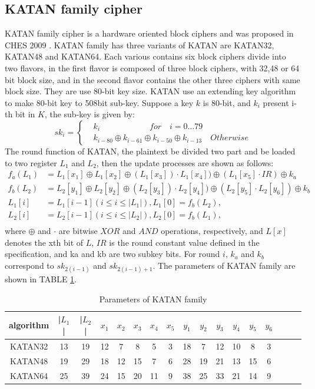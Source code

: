 \subsection{KATAN family cipher}
KATAN family cipher is a hardware oriented block ciphers and was proposed in CHES 2009 \cite{10.1007/978-3-642-04138-9_20}. KATAN family has three variants of KATAN are KATAN32, KATAN48 and KATAN64. Each various contains six block ciphers divide into two flavors, in the first flavor is composed of three block ciphers, with 32,48 or 64 bit block size, and in the second flavor contains the other three ciphers with same block size. They are use 80-bit key size. KATAN use an extending key algorithm to make 80-bit key to 508bit sub-key. Suppose a key $k$ is 80-bit, and $k_i$ present i-th bit in $K$, the sub-key is given by:
\begin{equation}
    sk_i=
\left\{
    \begin{aligned}
        &k_i\qquad\qquad\qquad for\quad i = 0\dots 79\\
        &k_{i-80}\oplus k_{i-61}\oplus k_{i-50}\oplus k_{i-13}\quad Otherwise
    \end{aligned}
\right.
\end{equation}The round function of KATAN, the plaintext be divided two part and be loaded to two register $L_1$ and $L_2$, then the update processes are shown as follows:
\begin{equation}
    \begin{aligned}
        f_a(L_1) &= L_1[x_1]\oplus L_1[x_2]\oplus (L_1[x_3])\cdot L_1[x_4])\oplus(L_1[x_5]\cdot IR)\oplus k_a\\
    f_b(L_2) &= L_2[y_1]\oplus L_2[y_2]\oplus (L_2[y_3])\cdot L_2[y_4])\oplus(L_2[y_5]\cdot L_2[y_6])\oplus k_b\\
    L_1[i] &= L_1[i-1](i\leq i\le |L_1|), L_1[0]=f_b(L_2),\\
    L_2[i]&=L_2[i-1](i\leq i\le |L_2|), L_2[0]=f_b(L_1),\\    
    \end{aligned}
\end{equation}
 where $\oplus$ and $\cdot$ are bitwise $XOR$ and $AND$ operations, respectively, and $L[x]$ denotes the x\-th bit of $L$, $IR$ is the round constant value defined in the specification, and ka and kb are two subkey bits. For round $i$, $k_a$ and $k_b$ correspond to $sk_{2(i-1)}$ and $sk_{2(i-1)+1}$. The parameters of KATAN family are shown in TABLE \ref{tb:KATAN_P}.
 \begin{table}[htbp]
	\centering  
	\caption{Parameters of KATAN family} 
	\label{tb:KATAN_P} 
	\begin{tabular}{|c||c|c|c|c|c|c|c|c|c|c|c|c|c|c|c|c|}  
        \hline  
        algorithm&|$L_1$|&|$L_2$|&$x_1$&$x_2$&$x_3$&$x_4$&$x_5$&$y_1$&$y_2$&$y_3$&$y_4$&$y_5$&$y_6$\\
		\hline  
		KATAN32&13&19&12&7&8&5&3&18&7&12&10&8&3\\
        KATAN48&19&29&18&12&15&7&6&28&19&21&13&15&6\\
        KATAN64&25&39&24&15&20&11&9&38&25&33&21&14&9\\
		\hline
	\end{tabular}
\end{table}
